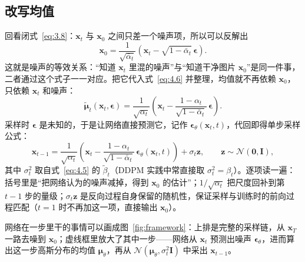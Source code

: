 \documentclass[UTF8,a4paper,12pt]{ctexart}
\numberwithin{equation}{section}
\begin{document}
\subsection{改写均值}

回看闭式~\eqref{eq:3.8}：$\bm{x}_t$ 与 $\bm{x}_0$ 之间只差一个噪声项，所以可以反解出
\begin{equation}\label{eq:4.7}
\bm{x}_0=\frac{1}{\sqrt{\bar{\alpha}_t}}
\left(\bm{x}_t-\sqrt{1-\bar{\alpha}_t}\,\bm{\epsilon}\right).
\end{equation}
这就是噪声的等效关系：“知道 $\bm{x}_t$ 里混的噪声”与“知道干净图片 $\bm{x}_0$”是同一件事，二者通过这个式子一一对应。把它代入式~\eqref{eq:4.6} 并整理，均值就不再依赖 $\bm{x}_0$，只依赖 $\bm{x}_t$ 和噪声：
\begin{equation}\label{eq:4.8}
\tilde{\bm{\mu}}_t(\bm{x}_t,\bm{\epsilon})
=\frac{1}{\sqrt{\alpha_t}}
\left(\bm{x}_t-\frac{1-\alpha_t}{\sqrt{1-\bar{\alpha}_t}}\,\bm{\epsilon}\right).
\end{equation}
采样时 $\bm{\epsilon}$ 是未知的，于是让网络直接预测它，记作 $\bm{\epsilon}_\theta(\bm{x}_t,t)$，代回即得单步采样公式：
\begin{equation}\label{eq:4.9}
\bm{x}_{t-1}=\frac{1}{\sqrt{\alpha_t}}
\left(\bm{x}_t-\frac{1-\alpha_t}{\sqrt{1-\bar{\alpha}_t}}\,
\bm{\epsilon}_\theta(\bm{x}_t,t)\right)+\sigma_t\bm{z},
\qquad \bm{z}\sim\mathcal{N}(\bm{0},\bm{I}),
\end{equation}
其中 $\sigma_t^2$ 取自式~\eqref{eq:4.5} 的 $\tilde{\beta}_t$（DDPM 实践中常直接取 $\sigma_t^2=\beta_t$）。逐项读一遍：括号里是“把网络认为的噪声减掉，得到 $\bm{x}_0$ 的估计”；$1/\sqrt{\alpha_t}$ 把尺度回补到第 $t-1$ 步的量级；$\sigma_t\bm{z}$ 是反向过程自身保留的随机性，保证采样与训练时的前向过程匹配（$t=1$ 时不再加这一项，直接输出 $\bm{x}_0$）。

网络在一步里干的事情可以画成图~\ref{fig:framework}：上排是完整的采样链，从 $\bm{x}_T$ 一路去噪到 $\bm{x}_0$；虚线框里放大了其中一步——网络从 $\bm{x}_t$ 预测出噪声 $\bm{\epsilon}_\theta$，进而算出这一步高斯分布的均值 $\bm{\mu}_\theta$，再从 $\mathcal{N}(\bm{\mu}_\theta,\sigma_t^2\bm{I})$ 中采出 $\bm{x}_{t-1}$。
\end{document}
